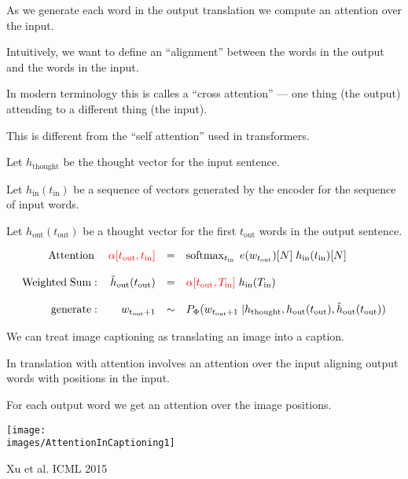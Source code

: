 {

As we generate each word in the output translation we compute an attention over the input.

\vfill
Intuitively, we want to define an ``alignment'' between the words in the output and the words in the input.

\vfill
In modern terminology this is calles a ``cross attention'' --- one thing (the output) attending to a different thing (the input).

\vfill
This is different from the ``self attention'' used in transformers.


Let $h_{\mathrm{thought}}$ be the thought vector for the input sentence.

\vfill
Let $h_{\mathrm{in}}(t_{\mathrm{in}})$ be a sequence of vectors generated by the encoder for the sequence of input words.

\vfill
Let $h_\mathrm{out}(t_\mathrm{out})$ be a thought vector for the first $t_\mathrm{out}$ words in the output sentence.

\vfill
{\huge
$$\begin{array}{rrcl}
  \mathrm{Attention}\; & {\color{red} \alpha[t_\mathrm{out},t_{\mathrm{in}}]} & =& \operatorname*{softmax}_{t_\mathrm{in}} \;e(w_{t_\mathrm{out}})[N]\;h_\mathrm{in}(t_\mathrm{in})[N] \\
   \\
   \mathrm{Weighted\; Sum:} & \tilde{h}_\mathrm{out}(t_\mathrm{out}) & = & {\color{red} \alpha[t_\mathrm{out},T_{\mathrm{in}}]}\;h_\mathrm{in}(T_{\mathrm{in}}) \\
  \\
  \mathrm{generate:} & w_\mathrm{t_\mathrm{out} + 1} & \sim & P_\Phi(w_{t_\mathrm{out}+1}\;|h_\mathrm{thought},
  h_\mathrm{out}(t_\mathrm{out}),
  \tilde{h}_\mathrm{out}(t_\mathrm{out}))
  \end{array}$$
}

We can treat image captioning as translating an image into a caption.

\vfill
In translation with attention involves an attention over the input aligning output words with positions in the input.

\vfill
For each output word we get an attention over the image positions.


\centerline{\texttt{[image: \\images/AttentionInCaptioning1]}}
\centerline{\Large Xu et al. ICML 2015}

}
